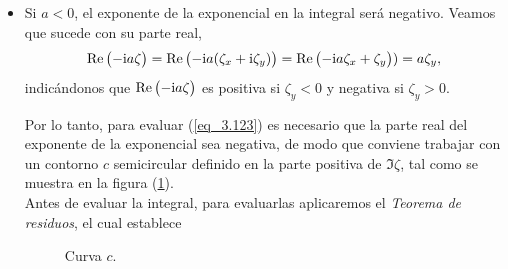 \begin{itemize} 
    \item[$i)$] Si $a<0$, el exponente de la exponencial en la integral será negativo. Veamos que sucede con su parte real,
        \begin{equation}
            \Re \qty\big(-\mathrm{i} a \zeta) = \Re \qty\big(-\mathrm{i} a \qty(\zeta_x + \mathrm{i} \zeta_y)) =  \Re \qty\big(-\mathrm{i} a \zeta_x + \zeta_y) ) = a \zeta_y,
            \label{eq_3.124}
        \end{equation}
    indicándonos que $\Re \qty\big(-\mathrm{i} a \zeta)$ es positiva si $\zeta_y < 0$ y negativa si $\zeta_y > 0$.   

    \begin{minipage}[b]{0.7\textwidth}
    Por lo tanto, para evaluar (\ref{eq_3.123}) es necesario que la parte real del exponente de la exponencial sea negativa, de modo que conviene trabajar con un contorno $c$ semicircular definido en la parte positiva de $\Im \zeta$, tal como se muestra en la figura (\ref{fig_3.2}).\\
    
    Antes de evaluar la integral, para evaluarlas aplicaremos el \emph{Teorema de residuos}, el cual establece
    \end{minipage}\hfill 
    \begin{minipage}[b]{0.3\textwidth}
        \begin{figure}[H]
        \centering
        \caption{\small{Curva $c$.}}
        \label{fig_3.2}
        \end{figure}
    \end{minipage}


\end{itemize}
